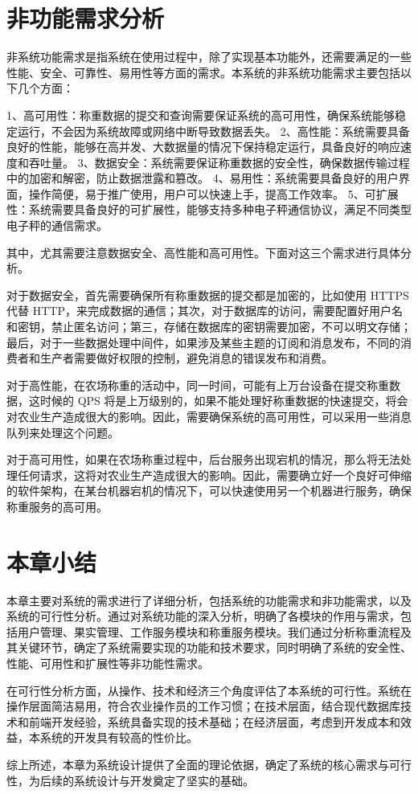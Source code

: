 \section{非功能需求分析}

非系统功能需求是指系统在使用过程中，除了实现基本功能外，还需要满足的一些性能、安全、可靠性、易用性等方面的需求。本系统的非系统功能需求主要包括以下几个方面：

1、高可用性：称重数据的提交和查询需要保证系统的高可用性，确保系统能够稳定运行，不会因为系统故障或网络中断导致数据丢失。
2、高性能：系统需要具备良好的性能，能够在高并发、大数据量的情况下保持稳定运行，具备良好的响应速度和吞吐量。
3、数据安全：系统需要保证称重数据的安全性，确保数据传输过程中的加密和解密，防止数据泄露和篡改。
4、易用性：系统需要具备良好的用户界面，操作简便，易于推广使用，用户可以快速上手，提高工作效率。
5、可扩展性：系统需要具备良好的可扩展性，能够支持多种电子秤通信协议，满足不同类型电子秤的通信需求。

其中，尤其需要注意数据安全、高性能和高可用性。下面对这三个需求进行具体分析。

对于数据安全，首先需要确保所有称重数据的提交都是加密的，比如使用 HTTPS 代替 HTTP，来完成数据的通信；其次，对于数据库的访问，需要配置好用户名和密钥，禁止匿名访问；第三，存储在数据库的密钥需要加密，不可以明文存储；最后，对于一些数据处理中间件，如果涉及某些主题的订阅和消息发布，不同的消费者和生产者需要做好权限的控制，避免消息的错误发布和消费。

对于高性能，在农场称重的活动中，同一时间，可能有上万台设备在提交称重数据，这时候的 QPS 将是上万级别的，如果不能处理好称重数据的快速提交，将会对农业生产造成很大的影响。因此，需要确保系统的高可用性，可以采用一些消息队列来处理这个问题。

对于高可用性，如果在农场称重过程中，后台服务出现宕机的情况，那么将无法处理任何请求，这将对农业生产造成很大的影响。因此，需要确立好一个良好可伸缩的软件架构，在某台机器宕机的情况下，可以快速使用另一个机器进行服务，确保称重服务的高可用。

\section{本章小结}

本章主要对系统的需求进行了详细分析，包括系统的功能需求和非功能需求，以及系统的可行性分析。通过对系统功能的深入分析，明确了各模块的作用与需求，包括用户管理、果实管理、工作服务模块和称重服务模块。我们通过分析称重流程及其关键环节，确定了系统需要实现的功能和技术要求，同时明确了系统的安全性、性能、可用性和扩展性等非功能性需求。

在可行性分析方面，从操作、技术和经济三个角度评估了本系统的可行性。系统在操作层面简洁易用，符合农业操作员的工作习惯；在技术层面，结合现代数据库技术和前端开发经验，系统具备实现的技术基础；在经济层面，考虑到开发成本和效益，本系统的开发具有较高的性价比。

综上所述，本章为系统设计提供了全面的理论依据，确定了系统的核心需求与可行性，为后续的系统设计与开发奠定了坚实的基础。
